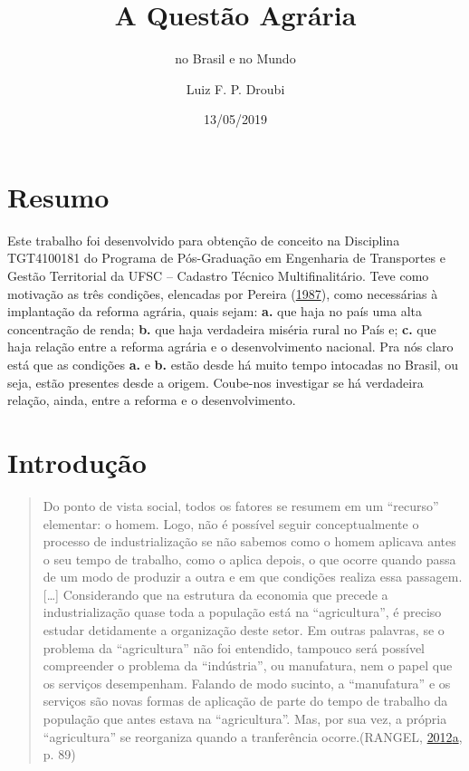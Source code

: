 \documentclass[a4paper, 12pt]{article}
\title{A Questão Agrária}
\subtitle{no Brasil e no Mundo}
\author{Luiz F. P. Droubi}
\date{13/05/2019}
\begin{document}
\maketitle

\hypertarget{resumo}{%
\section*{Resumo}\label{resumo}}

Este trabalho foi desenvolvido para obtenção de conceito na Disciplina
TGT4100181 do Programa de Pós-Graduação em Engenharia de Transportes e
Gestão Territorial da UFSC -- Cadastro Técnico Multifinalitário. Teve
como motivação as três condições, elencadas por Pereira
(\protect\hyperlink{ref-questaoagraria}{1987}), como necessárias à
implantação da reforma agrária, quais sejam: \textbf{a.} que haja no
país uma alta concentração de renda; \textbf{b.} que haja verdadeira
miséria rural no País e; \textbf{c.} que haja relação entre a reforma
agrária e o desenvolvimento nacional. Pra nós claro está que as
condições \textbf{a.} e \textbf{b.} estão desde há muito tempo intocadas
no Brasil, ou seja, estão presentes desde a origem. Coube-nos investigar
se há verdadeira relação, ainda, entre a reforma e o desenvolvimento.

\hypertarget{introducao}{%
\section{Introdução}\label{introducao}}

\begin{quote}
Do ponto de vista social, todos os fatores se resumem em um ``recurso''
elementar: o homem. Logo, não é possível seguir conceptualmente o
processo de industrialização se não sabemos como o homem aplicava antes
o seu tempo de trabalho, como o aplica depois, o que ocorre quando passa
de um modo de produzir a outra e em que condições realiza essa
passagem.{[}\ldots{}{]} Considerando que na estrutura da economia que
precede a industrialização quase toda a população está na
``agricultura'', é preciso estudar detidamente a organização deste
setor. Em outras palavras, se o problema da ``agricultura'' não foi
entendido, tampouco será possível compreender o problema da
``indústria'', ou manufatura, nem o papel que os serviços desempenham.
Falando de modo sucinto, a ``manufatura'' e os serviços são novas formas
de aplicação de parte do tempo de trabalho da população que antes estava
na ``agricultura''. Mas, por sua vez, a própria ``agricultura'' se
reorganiza quando a tranferência ocorre.(RANGEL,
\protect\hyperlink{ref-rangel1954}{2012}\protect\hyperlink{ref-rangel1954}{a},
p. 89)
\end{quote}
\end{document}
